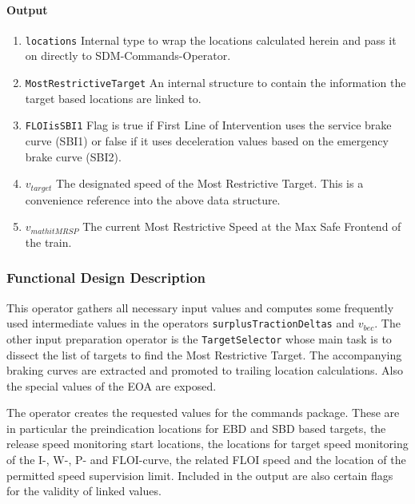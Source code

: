 \paragraph{Output}
\begin{enumerate}
  \item \texttt{locations} Internal type to wrap the locations calculated herein and pass it on directly to SDM-Commands-Operator.
  \item \texttt{MostRestrictiveTarget} An internal structure to contain the information the target based locations are linked to.
  \item \texttt{FLOIisSBI1} Flag is true if First Line of Intervention uses the service brake curve (SBI1) or false if it uses deceleration values based on the emergency brake curve (SBI2).
  \item \texttt{$v_{\mathit{target}}$} The designated speed of the Most Restrictive Target. This is a convenience reference into the above data structure. 
  \item \texttt{$v_{mathit{MRSP}}$} The current Most Restrictive Speed at the Max Safe Frontend of the train.
\end{enumerate}

\subsubsection{Functional Design Description}
This operator gathers all necessary input values and computes some frequently used intermediate values in the operators \texttt{surplusTractionDeltas} and \texttt{$v_{\mathit{bec}}$}. The other input preparation operator is the \texttt{TargetSelector} whose main task is to dissect the list of targets to find the Most Restrictive Target. The accompanying braking curves are extracted and promoted to trailing location calculations. Also the special values of the EOA are exposed.

The operator creates the requested values for the commands package. These are in particular the preindication locations for EBD and SBD based targets, the release speed monitoring start locations, the locations for target speed monitoring of the I-, W-, P- and FLOI-curve, the related FLOI speed and the location of the permitted speed supervision limit. Included in the output are also certain flags for the validity of linked values.


